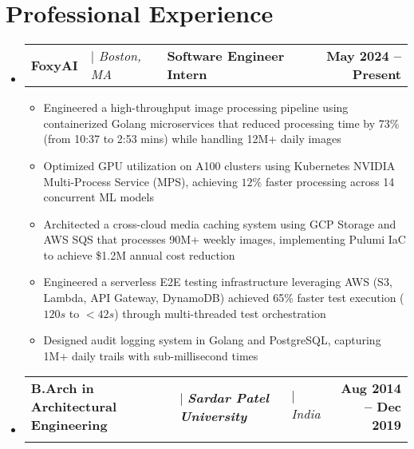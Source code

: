 \message{ !name(main.tex)}\documentclass[letterpaper,11pt]{article}
\makeatletter
\newcommand{\sectionspace}{\vspace{-15pt}}
\newcommand{\itemspace}{\vspace{-10pt}}
\newcommand{\eduItem}[5][]{
    \item
    \begin{tabular*}{\textwidth}
        {l@{\hspace{4pt}}l@{\hspace{4pt}}l@{\extracolsep{\fill}}r}
        \textbf{#2} & $|$ \textbf{\textit{#3}} & $|$ \textit{#5} & \textbf{#4} \\
        \ifx&#1&%
        \else
            \multicolumn{4}{l}{\small#1}
        \fi
    \end{tabular*}
    \itemspace
}
\newcommand{\expItem}[4]{
    \item
    \begin{tabular*}{\textwidth}
        {l@{\hspace{4pt}}l@{\extracolsep{\fill}}l@{\extracolsep{\fill}}r}
        \textbf{#1} & $|$ \textit{#2} & \textbf{#3} & \textbf{\small#4}
    \end{tabular*}
    \itemspace
}
\newcommand{\resumeItem}[1]{
  \item\small{#1}
}
\newcommand{\sectionStart}{
    \begin{itemize}[
        leftmargin=0pt,
        label={},
    ]
}
\newcommand{\sectionEnd}{
    \end{itemize}
    \sectionspace
}
\newcommand{\bulletStart}{
    \begin{itemize}[
        leftmargin=10pt,
        label={\textbullet},  %
        topsep=-7pt,    %
    ]
}
\newcommand{\bulletEnd}{
    \end{itemize}
    \sectionspace
}
\makeatother
\begin{document}
\section{Professional Experience}
  \sectionStart
    \expItem
      {FoxyAI}{Boston, MA}
      {Software Engineer Intern}{May 2024 -- Present}
      \bulletStart
       \resumeItem
          {Engineered a high-throughput image processing pipeline using containerized Golang microservices that reduced processing time by 73\% (from 10:37 to 2:53 mins) while handling 12M+ daily images}
        \resumeItem
          {Optimized GPU utilization on A100 clusters using Kubernetes NVIDIA Multi-Process Service (MPS), achieving $12\%$ faster processing across 14 concurrent ML models}
        \resumeItem
          {Architected a cross-cloud media caching system using GCP Storage and AWS SQS that processes 90M+ weekly images, implementing Pulumi IaC to achieve \$1.2M annual cost reduction}
        \resumeItem
          {Engineered a serverless E2E testing infrastructure leveraging AWS (S3, Lambda, API Gateway, DynamoDB) achieved 65\% faster test execution ($120s$ to $<42s$) through multi-threaded test orchestration}
        \resumeItem
          {Designed audit logging system in Golang and PostgreSQL, capturing 1M+ daily trails with sub-millisecond times}
      \bulletEnd

    \eduItem
      {B.Arch in Architectural Engineering}
      {Sardar Patel University}
      {Aug 2014 -- Dec 2019}
      {India}
  \sectionEnd
\end{document}
